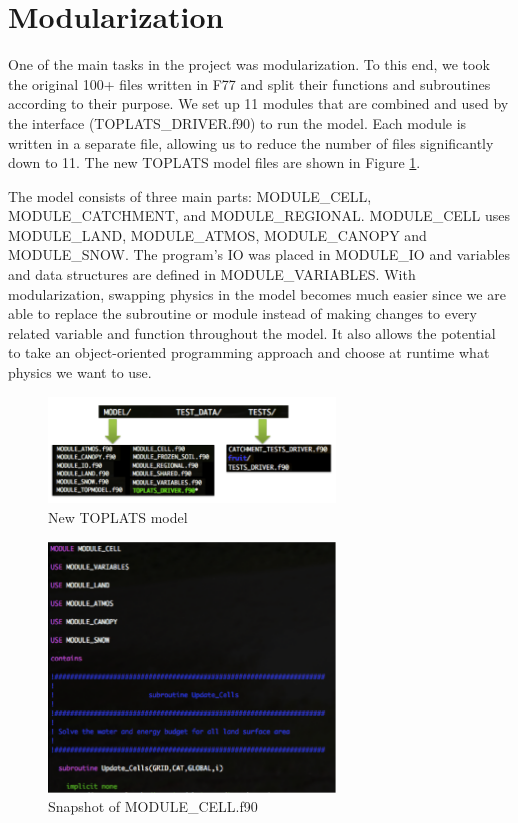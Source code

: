 \documentclass[pdftex,12pt,a4paper]{article}
\begin{document}
\section{Modularization}
One of the main tasks in the project was modularization. To this end, we took the original 100+ files written in F77 and split their functions and subroutines according to their purpose.  We set up 11 modules that are combined and used by the interface (TOPLATS\_DRIVER.f90) to run the model. Each module is written in a separate file, allowing us to reduce the number of files significantly down to 11.  The new TOPLATS model files are shown in Figure \ref{Modules1}. 

The model consists of three main parts: MODULE\_CELL,  MODULE\_CATCHMENT, and MODULE\_REGIONAL. MODULE\_CELL uses MODULE\_LAND, MODULE\_ATMOS, MODULE\_CANOPY and MODULE\_SNOW. The program's IO was placed in MODULE\_IO and variables and data structures are defined in MODULE\_VARIABLES. With modularization, swapping physics in the model becomes much easier since we are able to replace the subroutine or module instead of making changes to every related variable and function throughout the model. It also allows the potential to take an object-oriented programming approach and choose at runtime what physics we want to use.

\begin{figure}[h]
	\centering
	\includegraphics[width=3.0in]{Figures/Modules1.png}
	\caption{New TOPLATS model}
	\label{Modules1}
\end{figure}

\begin{figure}[h]
	\centering
	\includegraphics[width=3.0in]{Figures/Modules2.png}
	\caption{Snapshot of MODULE\_CELL.f90}
	\label{Modules2}
\end{figure}
\end{document}
